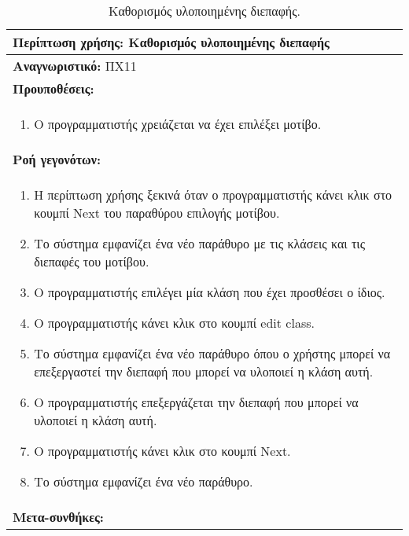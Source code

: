 \begin{table}[H]
	\hspace*{-0.2cm}
    \centering
    \scriptsize
	\begin{tabular}{|p{10cm}|}
	\hline
		\textbf{Περίπτωση χρήσης:} Καθορισμός υλοποιημένης διεπαφής  \\
	\hline
		\textbf{Αναγνωριστικό:} ΠΧ11 \\
	\hline	
		\textbf{Προυποθέσεις:} \\
		\begin{enumerate}
		 \item Ο προγραμματιστής χρειάζεται να έχει επιλέξει μοτίβο.
		\end{enumerate} \\
	\hline
		\textbf{Ροή γεγονότων:} \\
		\begin{enumerate}
			\item Η περίπτωση χρήσης ξεκινά όταν ο προγραμματιστής κάνει κλικ στο κουμπί Next του παραθύρου επιλογής μοτίβου.
			\item Το σύστημα εμφανίζει ένα νέο παράθυρο με τις κλάσεις και τις διεπαφές του μοτίβου.
			\item Ο προγραμματιστής επιλέγει μία κλάση που έχει προσθέσει ο ίδιος.
			\item Ο προγραμματιστής κάνει κλικ στο κουμπί edit class.
			\item Το σύστημα εμφανίζει ένα νέο παράθυρο όπου ο χρήστης μπορεί να επεξεργαστεί την διεπαφή που μπορεί να υλοποιεί η κλάση αυτή.
			\item Ο προγραμματιστής επεξεργάζεται την διεπαφή που μπορεί να υλοποιεί η κλάση αυτή.
			\item Ο προγραμματιστής κάνει κλικ στο κουμπί Next.
			\item Το σύστημα εμφανίζει ένα νέο παράθυρο.
		\end{enumerate} \\
	\hline
		\textbf{Μετα-συνθήκες:} \\
	\hline
    \end{tabular}
    \caption{Καθορισμός υλοποιημένης διεπαφής.}
    \label{tab:setImplementedInterface}
\end{table}
\label{sec:useCases}